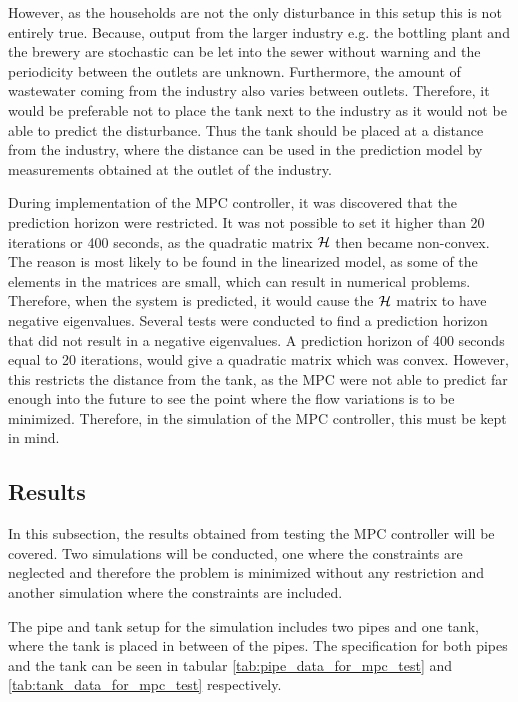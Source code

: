 However, as the households are not the only disturbance in this setup this is not entirely true. Because, output from the larger industry e.g. the bottling plant and the brewery are stochastic can be let into the sewer without warning and the periodicity between the outlets are unknown. Furthermore, the amount of wastewater coming from the industry also varies between outlets. Therefore, it would be preferable not to place the tank next to the industry as it would not be able to predict the disturbance. 
Thus the tank should be placed at a distance from the industry, where the distance can be used in the prediction model by measurements obtained at the outlet of the industry.%

During implementation of the MPC controller, it was discovered that the prediction horizon were restricted. It was not possible to set it higher than 20 iterations or 400 seconds, as the quadratic matrix $\CMcal{H}$ then became non-convex. The reason is most likely to be found in the linearized model, as some of the elements in the matrices are small, which can result in numerical problems. Therefore, when the system is predicted, it would cause the $\CMcal{H}$ matrix to have negative eigenvalues. Several tests were conducted to find a prediction horizon that did not result in a negative eigenvalues. A prediction horizon of 400 seconds equal to 20 iterations, would give a quadratic matrix which was convex. However, this restricts the distance from the tank, as the MPC were not able to predict far enough into the future to see the point where the flow variations is to be minimized.%
Therefore, in the simulation of the MPC controller, this must be kept in mind.   

\subsection*{Results}
In this subsection, the results obtained from testing the MPC controller will be covered. Two simulations will be conducted, one where the constraints are neglected and therefore the problem is minimized without any restriction and another simulation where the constraints are included. 

The pipe and tank setup for the simulation includes two pipes and one tank, where the tank is placed in between of the pipes. The specification for both pipes and the tank can be seen in tabular \ref{tab:pipe_data_for_mpc_test} and \ref{tab:tank_data_for_mpc_test} respectively.

